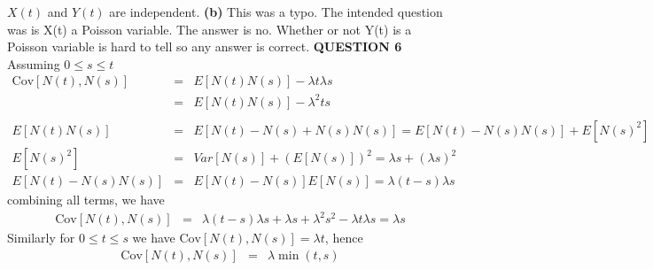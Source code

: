 \documentclass{amsart}
\theoremstyle{definition}
\theoremstyle{remark}
\numberwithin{equation}{section}
\begin{document}
\newline
$X(t)$ and $Y(t)$ are independent. \newline
\newline
{\bf (b)}
\newline
This was a typo. The intended question was is X(t) a Poisson
variable. The answer is no. Whether or not Y(t) is a Poisson
variable is hard to tell so any answer is correct. \newline
\newline
\bigskip
{\bf QUESTION 6}
\newline
Assuming $0\leq s \leq t$ \newline
\begin{eqnarray}
\nonumber \text{Cov}[N(t),N(s)]&=&E[N(t)N(s)]-\lambda t \lambda
s\\
\nonumber &=&E[N(t)N(s)]-\lambda^2ts \\
\nonumber \\
\nonumber
E[N(t)N(s)]&=&E[{N(t)-N(s)+N(s)}N(s)]=E[{N(t)-N(s)}N(s)]+E[N(s)^2]
\\
\nonumber E[N(s)^2]&=&Var[N(s)]+(E[N(s)])^2= \lambda s + (\lambda
s)^2 \\
\nonumber
E[{N(t)-N(s)}N(s)]&=&E[N(t)-N(s)]E[N(s)]=\lambda(t-s)\lambda s
\end{eqnarray}
combining all terms, we have
\begin{eqnarray}
 \nonumber
\text{Cov}[N(t),N(s)]&=&\lambda(t-s)\lambda s + \lambda s +
\lambda^2 s^2 -\lambda t \lambda s =\lambda s
\end{eqnarray}
\newline
Similarly for $0\leq t \leq s$ we have
$\text{Cov}[N(t),N(s)]=\lambda t$, hence
\begin{eqnarray}
 \nonumber
\text{Cov}[N(t),N(s)]&=&\lambda \min(t,s)
\end{eqnarray}
\newline
\end{document}
